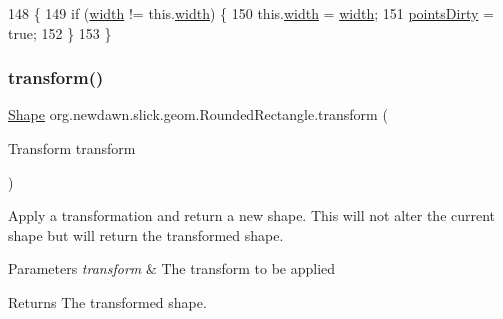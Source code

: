 \begin{DoxyCode}
148                                       \{
149         \textcolor{keywordflow}{if} (\mbox{\hyperlink{classorg_1_1newdawn_1_1slick_1_1geom_1_1_rectangle_a967e1823f62daf45abb142779d1be62d}{width}} != this.\mbox{\hyperlink{classorg_1_1newdawn_1_1slick_1_1geom_1_1_rectangle_a967e1823f62daf45abb142779d1be62d}{width}}) \{
150             this.\mbox{\hyperlink{classorg_1_1newdawn_1_1slick_1_1geom_1_1_rectangle_a967e1823f62daf45abb142779d1be62d}{width}} = \mbox{\hyperlink{classorg_1_1newdawn_1_1slick_1_1geom_1_1_rectangle_a967e1823f62daf45abb142779d1be62d}{width}};
151             \mbox{\hyperlink{classorg_1_1newdawn_1_1slick_1_1geom_1_1_shape_a61fe1954d2fdefc72c34b284f4fcfdb4}{pointsDirty}} = \textcolor{keyword}{true};
152         \}
153     \}
\end{DoxyCode}
\mbox{\label{classorg_1_1newdawn_1_1slick_1_1geom_1_1_rounded_rectangle_a555336c3e44a0c74cd466ee01ec163cc}} 
\subsubsection{\texorpdfstring{transform()}{transform()}}
{\footnotesize\ttfamily \mbox{\hyperlink{classorg_1_1newdawn_1_1slick_1_1geom_1_1_shape}{Shape}} org.\+newdawn.\+slick.\+geom.\+Rounded\+Rectangle.\+transform (\begin{DoxyParamCaption}\item[{Transform}]{transform }\end{DoxyParamCaption})\hspace{0.3cm}{\ttfamily [inline]}}

Apply a transformation and return a new shape. This will not alter the current shape but will return the transformed shape.


\begin{DoxyParams}{Parameters}
{\em transform} & The transform to be applied \\
\hline
\end{DoxyParams}
\begin{DoxyReturn}{Returns}
The transformed shape. 
\end{DoxyReturn}

